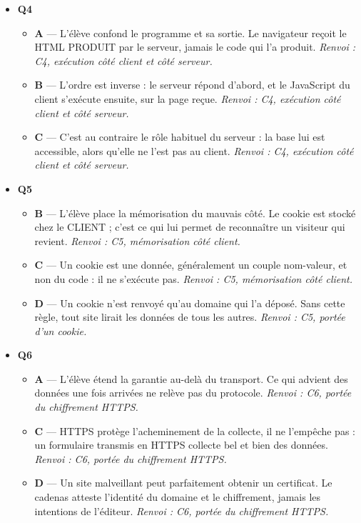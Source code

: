 \begin{itemize}
\begin{itemize}
  \end{itemize}
  \item \textbf{Q4}
  \begin{itemize}
    \item \textbf{A} — L'élève confond le programme et sa sortie. Le navigateur reçoit le HTML PRODUIT par le serveur, jamais le code qui l'a produit. \emph{Renvoi : C4, exécution côté client et côté serveur.}
    \item \textbf{B} — L'ordre est inverse : le serveur répond d'abord, et le JavaScript du client s'exécute ensuite, sur la page reçue. \emph{Renvoi : C4, exécution côté client et côté serveur.}
    \item \textbf{C} — C'est au contraire le rôle habituel du serveur : la base lui est accessible, alors qu'elle ne l'est pas au client. \emph{Renvoi : C4, exécution côté client et côté serveur.}
  \end{itemize}
  \item \textbf{Q5}
  \begin{itemize}
    \item \textbf{B} — L'élève place la mémorisation du mauvais côté. Le cookie est stocké chez le CLIENT ; c'est ce qui lui permet de reconnaître un visiteur qui revient. \emph{Renvoi : C5, mémorisation côté client.}
    \item \textbf{C} — Un cookie est une donnée, généralement un couple nom-valeur, et non du code : il ne s'exécute pas. \emph{Renvoi : C5, mémorisation côté client.}
    \item \textbf{D} — Un cookie n'est renvoyé qu'au domaine qui l'a déposé. Sans cette règle, tout site lirait les données de tous les autres. \emph{Renvoi : C5, portée d'un cookie.}
  \end{itemize}
  \item \textbf{Q6}
  \begin{itemize}
    \item \textbf{A} — L'élève étend la garantie au-delà du transport. Ce qui advient des données une fois arrivées ne relève pas du protocole. \emph{Renvoi : C6, portée du chiffrement HTTPS.}
    \item \textbf{C} — HTTPS protège l'acheminement de la collecte, il ne l'empêche pas : un formulaire transmis en HTTPS collecte bel et bien des données. \emph{Renvoi : C6, portée du chiffrement HTTPS.}
    \item \textbf{D} — Un site malveillant peut parfaitement obtenir un certificat. Le cadenas atteste l'identité du domaine et le chiffrement, jamais les intentions de l'éditeur. \emph{Renvoi : C6, portée du chiffrement HTTPS.}

\end{itemize}
\end{itemize}
